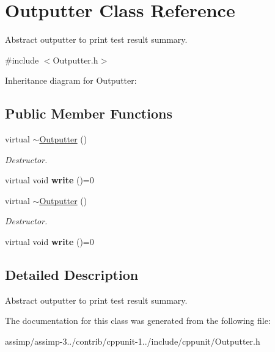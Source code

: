 \hypertarget{class_outputter}{\section{Outputter Class Reference}
\label{class_outputter}
}


Abstract outputter to print test result summary.  




{\ttfamily \#include $<$Outputter.\+h$>$}



Inheritance diagram for Outputter\+:
\subsection*{Public Member Functions}
\begin{DoxyCompactItemize}
\item 
\hypertarget{class_outputter_a0af584ecb81380ff38e3875b65ad4dd5}{virtual \hyperlink{class_outputter_a0af584ecb81380ff38e3875b65ad4dd5}{$\sim$\+Outputter} ()}\label{class_outputter_a0af584ecb81380ff38e3875b65ad4dd5}

\begin{DoxyCompactList}\small\item\em Destructor. \end{DoxyCompactList}\item 
\hypertarget{class_outputter_a0a5f32693d53ed33ceb8385041cb4b68}{virtual void {\bfseries write} ()=0}\label{class_outputter_a0a5f32693d53ed33ceb8385041cb4b68}

\item 
\hypertarget{class_outputter_a0af584ecb81380ff38e3875b65ad4dd5}{virtual \hyperlink{class_outputter_a0af584ecb81380ff38e3875b65ad4dd5}{$\sim$\+Outputter} ()}\label{class_outputter_a0af584ecb81380ff38e3875b65ad4dd5}

\begin{DoxyCompactList}\small\item\em Destructor. \end{DoxyCompactList}\item 
\hypertarget{class_outputter_a0a5f32693d53ed33ceb8385041cb4b68}{virtual void {\bfseries write} ()=0}\label{class_outputter_a0a5f32693d53ed33ceb8385041cb4b68}

\end{DoxyCompactItemize}


\subsection{Detailed Description}
Abstract outputter to print test result summary. 

The documentation for this class was generated from the following file\+:\begin{DoxyCompactItemize}
\item 
assimp/assimp-\/3../contrib/cppunit-\/1../include/cppunit/Outputter.\+h\end{DoxyCompactItemize}
